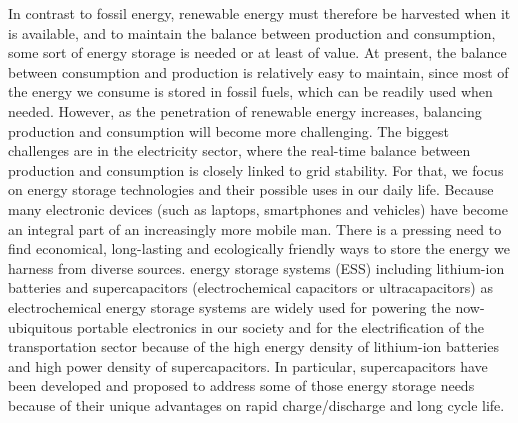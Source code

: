 \documentclass[reprint,amsmath,amssymb,aps,floatfix,
]{revtex4-2}
\begin{document}
In contrast to fossil energy, renewable energy must therefore be harvested when it is available, and to maintain the balance between production and consumption, some sort of energy storage is needed or at least of value. At present, the balance between consumption and production is relatively easy to maintain, since most of the energy we consume is stored in fossil fuels, which  can be readily used when needed. However, as the penetration of renewable energy increases, balancing production and consumption will become more challenging. The biggest challenges are in the electricity sector, where the real-time balance between production and consumption is closely linked to grid stability. For that, we focus on energy storage technologies and their possible uses in our daily life. Because many electronic devices (such as laptops, smartphones and vehicles) have become an integral part of an increasingly more mobile man. There is a pressing need to find economical, long-lasting and ecologically friendly ways to store the energy we harness from diverse sources. energy storage systems (ESS) including lithium-ion batteries and  supercapacitors (electrochemical capacitors or ultracapacitors) as electrochemical energy storage systems are widely used for powering the now-ubiquitous portable electronics in our society and for the electrification of the transportation sector because of the high energy density of lithium-ion  batteries and high power density of supercapacitors. In particular, supercapacitors have been developed and proposed to address some of those energy storage needs because of their unique advantages on rapid charge/discharge and long cycle life.
\end{document}
